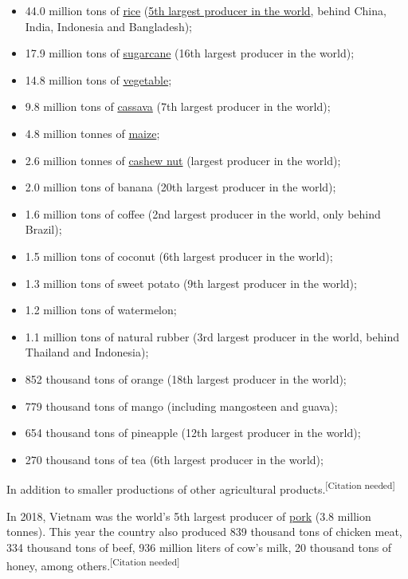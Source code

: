 \documentclass[openany]{book}
\begin{document}
\begin{itemize}
    \item 44.0 million tons of \href{https://en.wikipedia.org/wiki/Rice}{rice} (\href{https://en.wikipedia.org/wiki/Rice_production_in_Vietnam}{5th largest producer in the world}, behind China, India, Indonesia and Bangladesh);
    \item 17.9 million tons of \href{https://en.wikipedia.org/wiki/Sugarcane}{sugarcane} (16th largest producer in the world);
    \item 14.8 million tons of \href{https://en.wikipedia.org/wiki/Vegetable}{vegetable};
    \item 9.8 million tons of \href{https://en.wikipedia.org/wiki/Cassava}{cassava} (7th largest producer in the world);
    \item 4.8 million tonnes of \href{https://en.wikipedia.org/wiki/Maize}{maize};
    \item 2.6 million tonnes of \href{https://en.wikipedia.org/wiki/Cashew_nut}{cashew nut} (largest producer in the world);
    \item 2.0 million tons of banana (20th largest producer in the world);
    \item 1.6 million tons of coffee (2nd largest producer in the world, only behind Brazil);
    \item 1.5 million tons of coconut (6th largest producer in the world);
    \item 1.3 million tons of sweet potato (9th largest producer in the world);
    \item 1.2 million tons of watermelon;
    \item 1.1 million tons of natural rubber (3rd largest producer in the world, behind Thailand and Indonesia);
    \item 852 thousand tons of orange (18th largest producer in the world);
    \item 779 thousand tons of mango (including mangosteen and guava);
    \item 654 thousand tons of pineapple (12th largest producer in the world);
    \item 270 thousand tons of tea (6th largest producer in the world);
\end{itemize}

In addition to smaller productions of other agricultural products.\textsuperscript{[Citation needed]}

In 2018, Vietnam was the world's 5th largest producer of \href{https://en.wikipedia.org/wiki/Pork}{pork} (3.8 million tonnes). This year the country also produced 839 thousand tons of chicken meat, 334 thousand tons of beef, 936 million liters of cow's milk, 20 thousand tons of honey, among others.\textsuperscript{[Citation needed]}
\end{document}
